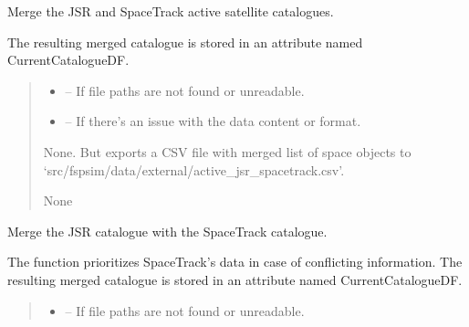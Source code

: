 \documentclass[letterpaper,10pt,english]{sphinxmanual}
\begin{document}
\begin{fulllineitems}
\begin{fulllineitems}
\label{\detokenize{fspsim.utils:fspsim.utils.SpaceCatalogue.SpaceCatalogue.CreateCatalogueActive}}
\pysigstartsignatures
{}
\pysigstopsignatures
\sphinxAtStartPar
Merge the JSR and SpaceTrack active satellite catalogues.

\sphinxAtStartPar
The resulting merged catalogue is stored in an attribute named CurrentCatalogueDF.
\begin{quote}\begin{description}
\begin{itemize}
\item {} 
\sphinxAtStartPar
{} – If file paths are not found or unreadable.

\item {} 
\sphinxAtStartPar
{} – If there’s an issue with the data content or format.

\end{itemize}

\sphinxAtStartPar
None. But exports a CSV file with merged list of space objects to ‘src/fspsim/data/external/active\_jsr\_spacetrack.csv’.

\sphinxAtStartPar
None

\end{description}\end{quote}

\end{fulllineitems}


\begin{fulllineitems}
\label{\detokenize{fspsim.utils:fspsim.utils.SpaceCatalogue.SpaceCatalogue.CreateCatalogueAll}}
\pysigstartsignatures
{}
\pysigstopsignatures
\sphinxAtStartPar
Merge the JSR catalogue with the SpaceTrack catalogue.

\sphinxAtStartPar
The function prioritizes SpaceTrack’s data in case of conflicting information.
The resulting merged catalogue is stored in an attribute named CurrentCatalogueDF.
\begin{quote}\begin{description}
\begin{itemize}
\item {} 
\sphinxAtStartPar
{} – If file paths are not found or unreadable.


\end{itemize}
\end{description}
\end{quote}
\end{fulllineitems}
\end{fulllineitems}
\end{document}

